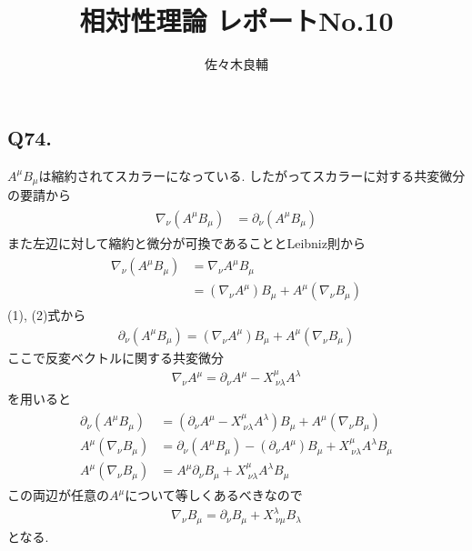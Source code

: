 \documentclass[uplatex,a4j,11pt,dvipdfmx]{jsarticle}
\begin{document}
\title{相対性理論 レポートNo.10}
\author{佐々木良輔}
\date{}
\maketitle
\subsection*{Q74.}
$A^\mu B_\mu$は縮約されてスカラーになっている.
したがってスカラーに対する共変微分の要請から
\begin{align}
  \begin{split}
    \nabla_\nu(A^\mu B_\mu)&=\partial_\nu(A^\mu B_\mu)
  \end{split}
\end{align}
また左辺に対して縮約と微分が可換であることとLeibniz則から
\begin{align}
  \begin{split}
    \nabla_\nu(A^\mu B_\mu)&=\nabla_\nu A^\mu B_\mu\\
    &=(\nabla_\nu A^\mu)B_\mu+A^\mu(\nabla_\nu B_\mu)
  \end{split}
\end{align}
(1), (2)式から
\begin{align}
  \partial_\nu(A^\mu B_\mu)=(\nabla_\nu A^\mu)B_\mu+A^\mu(\nabla_\nu B_\mu)
\end{align}
ここで反変ベクトルに関する共変微分
\begin{align}
  \nabla_\nu A^\mu=\partial_\nu A^\mu-X^\mu_{\ \nu\lambda}A^\lambda
\end{align}
を用いると
\begin{align}
  \begin{split}
    \partial_\nu(A^\mu B_\mu)&=(\partial_\nu A^\mu-X^\mu_{\ \nu\lambda}A^\lambda)B_\mu+A^\mu(\nabla_\nu B_\mu)\\
    A^\mu(\nabla_\nu B_\mu)&=\partial_\nu(A^\mu B_\mu)-(\partial_\nu A^\mu)B_\mu+X^\mu_{\ \nu\lambda}A^\lambda B_\mu\\
    A^\mu(\nabla_\nu B_\mu)&=A^\mu\partial_\nu B_\mu+X^\mu_{\ \nu\lambda}A^\lambda B_\mu
  \end{split}
\end{align}
この両辺が任意の$A^\mu$について等しくあるべきなので
\begin{align}
  \nabla_\nu B_\mu=\partial_\nu B_\mu+X^\lambda_{\ \nu\mu}B_\lambda
\end{align}
となる.
\end{document}
